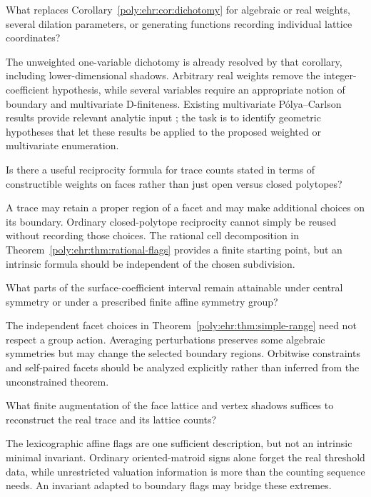 \documentclass[11pt,a4paper]{article}
\numberwithin{equation}{section}
\theoremstyle{plain}
\begin{document}
\begin{question}
What replaces Corollary~\ref{poly:ehr:cor:dichotomy} for algebraic or real weights,
several dilation parameters, or generating functions recording individual
lattice coordinates?
\end{question}
The unweighted one-variable dichotomy is already resolved by that
corollary, including lower-dimensional shadows. Arbitrary real weights
remove the integer-coefficient hypothesis, while several variables require
an appropriate notion of boundary and multivariate D-finiteness. Existing
multivariate P\'olya--Carlson results provide relevant analytic input
\cite{ehr:yu}; the task is to identify geometric hypotheses that let these
results be applied to the proposed weighted or multivariate enumeration.

\begin{question}
Is there a useful reciprocity formula for trace counts stated in terms of
constructible weights on faces rather than just open versus closed
polytopes?
\end{question}
A trace may retain a proper region of a facet and may make additional
choices on its boundary. Ordinary closed-polytope reciprocity cannot simply
be reused without recording those choices. The rational cell decomposition
in Theorem~\ref{poly:ehr:thm:rational-flags} provides a finite starting point, but
an intrinsic formula should be independent of the chosen subdivision.

\begin{question}
What parts of the surface-coefficient interval remain attainable under
central symmetry or under a prescribed finite affine symmetry group?
\end{question}
The independent facet choices in Theorem~\ref{poly:ehr:thm:simple-range} need not
respect a group action. Averaging perturbations preserves some algebraic
symmetries but may change the selected boundary regions. Orbitwise
constraints and self-paired facets should be analyzed explicitly rather
than inferred from the unconstrained theorem.

\begin{question}
What finite augmentation of the face lattice and vertex shadows suffices
to reconstruct the real trace and its lattice counts?
\end{question}
The lexicographic affine flags are one sufficient description, but not an
intrinsic minimal invariant. Ordinary oriented-matroid signs alone forget
the real threshold data, while unrestricted valuation information is more
than the counting sequence needs. An invariant adapted to boundary flags
may bridge these extremes.
\end{document}
